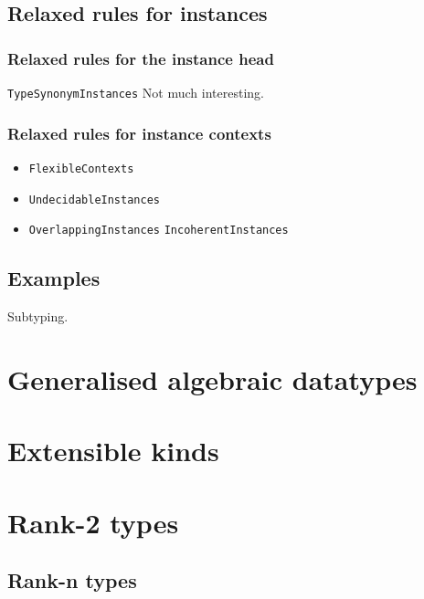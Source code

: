 \documentclass[11pt,oneside,draft]{fithesis2}
\begin{document}
\subsection{Relaxed rules for instances}

\subsubsection{Relaxed rules for the instance head}

\texttt{TypeSynonymInstances} Not much interesting.

\subsubsection{Relaxed rules for instance contexts}

\begin{itemize}
\item \texttt{FlexibleContexts}
\item \texttt{UndecidableInstances}
\item \texttt{OverlappingInstances} \texttt{IncoherentInstances}
\end{itemize}

\subsection{Examples}

Subtyping.

\section{Generalised algebraic datatypes}

\section{Extensible kinds}

\section{Rank-2 types}

\subsection{Rank-n types}

\end{document}

